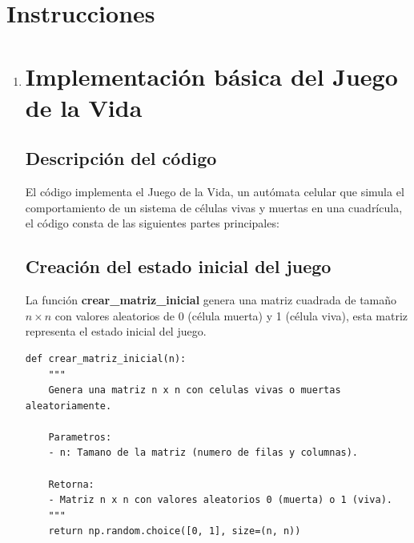 \section{Instrucciones}

\begin{enumerate}
    \item \section{Implementación básica del Juego de la Vida}
    \subsection{Descripción del código}

El código implementa el Juego de la Vida, un autómata celular que simula el comportamiento de un sistema de células vivas y muertas en una cuadrícula, el código consta de las siguientes partes principales:

\subsection{Creación del estado inicial del juego}

La función \textbf{crear\_matriz\_inicial} genera una matriz cuadrada de tamaño $n \times n$ con valores aleatorios de 0 (célula muerta) y 1 (célula viva), esta matriz representa el estado inicial del juego.

\begin{lstlisting}
def crear_matriz_inicial(n):
    """
    Genera una matriz n x n con celulas vivas o muertas aleatoriamente.
    
    Parametros:
    - n: Tamano de la matriz (numero de filas y columnas).
    
    Retorna:
    - Matriz n x n con valores aleatorios 0 (muerta) o 1 (viva).
    """
    return np.random.choice([0, 1], size=(n, n))
\end{lstlisting}


\end{enumerate}
